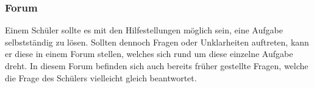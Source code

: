 \subsubsection*{Forum}
Einem Schüler sollte es mit den Hilfestellungen möglich sein, eine Aufgabe selbstständig zu lösen. Sollten dennoch Fragen oder Unklarheiten auftreten, kann er diese in einem Forum stellen, welches sich rund um diese einzelne Aufgabe dreht. In diesem Forum befinden sich auch bereits früher gestellte Fragen, welche die Frage des Schülers vielleicht gleich beantwortet.


\newpage